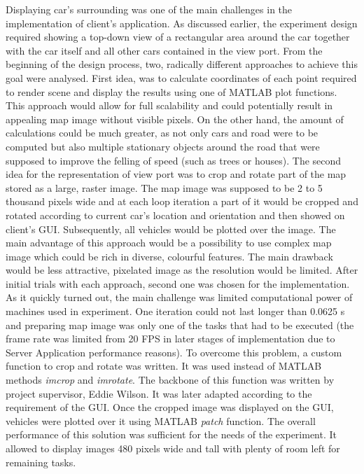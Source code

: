 \documentclass[11pt,english]{article}
\begin{document}
Displaying car's surrounding was one of the main challenges in the implementation of client's application. As discussed earlier, the experiment design required showing a top-down view of a rectangular area around the car together with the car itself and all other cars contained in the view port. From the beginning of the design process, two, radically different approaches to achieve this goal were analysed. First idea, was to calculate coordinates of each point required to render scene and display the results using one of MATLAB plot functions. This approach would allow for full scalability and could potentially result in appealing map image without visible pixels. On the other hand, the amount of calculations could be much greater, as not only cars and road were to be computed but also multiple stationary objects around the road that were supposed to improve the felling of speed (such as trees or houses). 
The second idea for the representation of view port was to crop and rotate part of the map stored as a large, raster image. The  map image was supposed to be 2 to 5 thousand pixels wide and at each loop iteration a part of it would be cropped and rotated according to current car's location and orientation and then showed on client's GUI. Subsequently, all vehicles would be plotted over the image. The main advantage of this approach would be a possibility to use complex map image which could be rich in diverse, colourful features. The main drawback would be less attractive, pixelated image as the resolution would be limited. 
After initial trials with each approach, second one was chosen for the implementation. As it quickly turned out, the main challenge was limited computational power of machines used in experiment. One iteration could not last longer than 0.0625 s and preparing map image was only one of the tasks that had to be executed (the frame rate was limited from 20 FPS in later stages of implementation due to Server Application performance reasons). To overcome this problem, a custom function to crop and rotate was written. It was used instead of MATLAB methods \textit{imcrop} and \textit{imrotate}. The backbone of this function was written by project supervisor, Eddie Wilson. It was later adapted according to the requirement of the GUI. 
Once the cropped image was displayed on the GUI, vehicles were plotted over it using MATLAB \textit{patch} function. The overall performance of this solution was sufficient for the needs of the experiment. It allowed to display images 480 pixels wide and tall with plenty of room left for remaining tasks.
\end{document}
